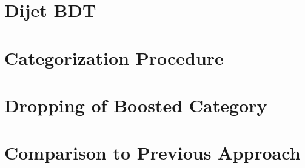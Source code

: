 \section{Dijet BDT}

\section{Categorization Procedure}

\section{Dropping of Boosted Category}

\section{Comparison to Previous Approach}
